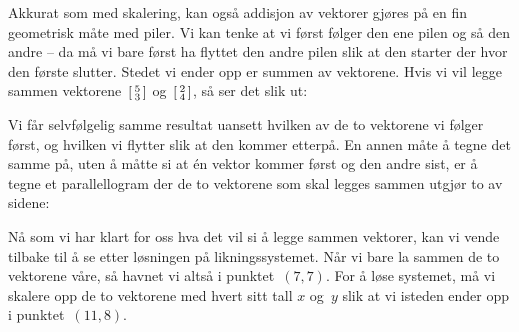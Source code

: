 Akkurat som med skalering, kan også addisjon av vektorer gjøres på en
fin geometrisk måte med piler.  Vi kan tenke at vi først følger den
ene pilen og så den andre -- da må vi bare først ha flyttet den andre
pilen slik at den starter der hvor den første slutter.  Stedet vi
ender opp er summen av vektorene.  Hvis vi vil legge sammen
vektorene~$\left[ \begin{smallmatrix} 5 \\ 3 \end{smallmatrix} \right]$ og~$\left[ \begin{smallmatrix} 2 \\ 4 \end{smallmatrix} \right]$, så ser det slik ut:
\begin{center}
\end{center}
Vi får selvfølgelig samme resultat uansett hvilken av de to vektorene
vi følger først, og hvilken vi flytter slik at den kommer etterpå.  En
annen måte å tegne det samme på, uten å måtte si at én vektor kommer
først og den andre sist, er å tegne et parallellogram der de to
vektorene som skal legges sammen utgjør to av sidene:
\begin{center}
\end{center}

Nå som vi har klart for oss hva det vil si å legge sammen vektorer,
kan vi vende tilbake til å se etter løsningen på likningssystemet.
Når vi bare la sammen de to vektorene våre, så havnet vi altså i
punktet~$(7,7)$.  For å løse systemet, må vi skalere opp de to
vektorene med hvert sitt tall $x$ og~$y$ slik at vi isteden ender opp
i punktet~$(11,8)$.

